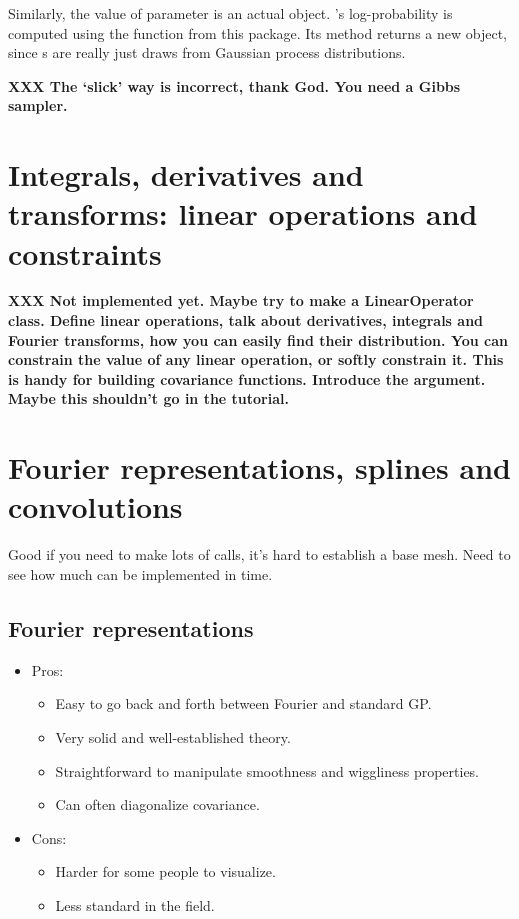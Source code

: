 \documentclass{manual}
\begin{document}
Similarly, the value of parameter  is an actual  object. 's log-probability is computed using the  function from this package. Its  method returns a new  object, since s are really just draws from Gaussian process distributions.

\textbf{XXX The `slick' way is incorrect, thank God. You need a Gibbs sampler.}

\section{Integrals, derivatives and transforms: linear operations and constraints}\label{sec:linop} %

\textbf{XXX Not implemented yet. Maybe try to make a LinearOperator class. Define linear operations, talk about derivatives, integrals and Fourier transforms, how you can easily find their distribution. You can constrain the value of any linear operation, or softly constrain it. This is handy for building covariance functions. Introduce the  argument. Maybe this shouldn't go in the tutorial.}


\section{Fourier representations, splines and convolutions}\label{sec:approx} %
Good if you need to make lots of calls, it's hard to establish a base mesh. Need to see how much can be implemented in time.

\subsection{Fourier representations}\label{sub:fourier}
\begin{itemize}
	\item Pros:
	\begin{itemize}
		\item Easy to go back and forth between Fourier and standard GP.
		\item Very solid and well-established theory.
		\item Straightforward to manipulate smoothness and wiggliness properties.
		\item Can often diagonalize covariance.
	\end{itemize}
	\item Cons:
	\begin{itemize}
		\item Harder for some people to visualize.
		\item Less standard in the field.
	\end{itemize}
\end{itemize}
\end{document}
